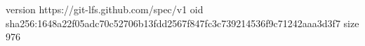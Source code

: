 version https://git-lfs.github.com/spec/v1
oid sha256:1648a22f05adc70c52706b13fdd2567f847fc3c739214536f9c71242aaa3d3f7
size 976
